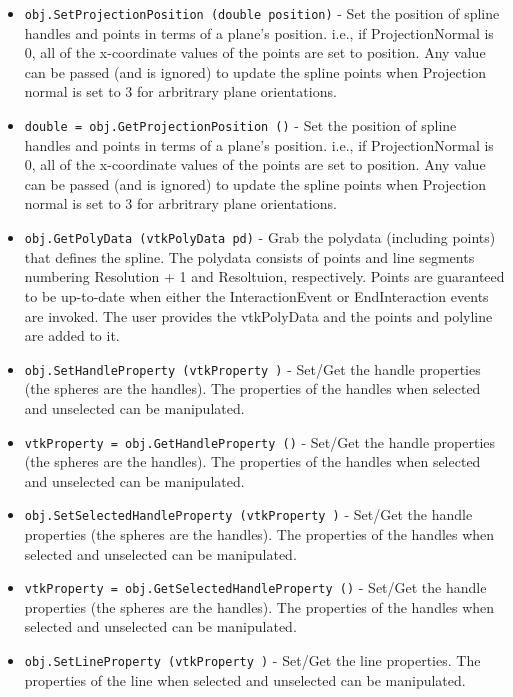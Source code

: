 \begin{itemize}
\item  \verb|obj.SetProjectionPosition (double position)| -  Set the position of spline handles and points in terms of a plane's
 position. i.e., if ProjectionNormal is 0, all of the x-coordinate
 values of the points are set to position. Any value can be passed (and is
 ignored) to update the spline points when Projection normal is set to 3
 for arbritrary plane orientations.

\item  \verb|double = obj.GetProjectionPosition ()| -  Set the position of spline handles and points in terms of a plane's
 position. i.e., if ProjectionNormal is 0, all of the x-coordinate
 values of the points are set to position. Any value can be passed (and is
 ignored) to update the spline points when Projection normal is set to 3
 for arbritrary plane orientations.

\item  \verb|obj.GetPolyData (vtkPolyData pd)| -  Grab the polydata (including points) that defines the spline.  The
 polydata consists of points and line segments numbering Resolution + 1
 and Resoltuion, respectively. Points are guaranteed to be up-to-date when
 either the InteractionEvent or  EndInteraction events are invoked. The
 user provides the vtkPolyData and the points and polyline are added to it.

\item  \verb|obj.SetHandleProperty (vtkProperty )| -  Set/Get the handle properties (the spheres are the handles). The
 properties of the handles when selected and unselected can be manipulated.

\item  \verb|vtkProperty = obj.GetHandleProperty ()| -  Set/Get the handle properties (the spheres are the handles). The
 properties of the handles when selected and unselected can be manipulated.

\item  \verb|obj.SetSelectedHandleProperty (vtkProperty )| -  Set/Get the handle properties (the spheres are the handles). The
 properties of the handles when selected and unselected can be manipulated.

\item  \verb|vtkProperty = obj.GetSelectedHandleProperty ()| -  Set/Get the handle properties (the spheres are the handles). The
 properties of the handles when selected and unselected can be manipulated.

\item  \verb|obj.SetLineProperty (vtkProperty )| -  Set/Get the line properties. The properties of the line when selected
 and unselected can be manipulated.


\end{itemize}
